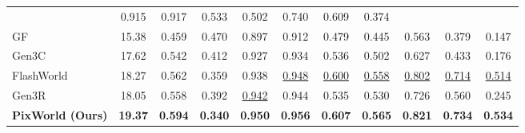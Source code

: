 \begin{table}[t]
{\begin{tabular}{l ccc cccc ccc}
& 0.915 & 0.917 & 0.533 & 0.502 
& 0.740 & 0.609 & 0.374 \\
GF~\citep{wu2025geometry}           
& 15.38 & 0.459 & 0.470 
& 0.897 & 0.912 & 0.479 & 0.445 
& 0.563 & 0.379 & 0.147 \\
Gen3C~\citep{ren2025gen3c}          
& 17.62 & 0.542 & 0.412 
& 0.927 & 0.934 & 0.536 & 0.502 
& 0.627 & 0.433 & 0.176 \\
FlashWorld~\citep{li2025flashworld} 
& 18.27 & 0.562 & 0.359 
& 0.938 & \underline{0.948} & \underline{0.600} & \underline{0.558} 
& \underline{0.802} & \underline{0.714} & \underline{0.514} \\
Gen3R~\citep{huang2026gen3r}        
& 18.05 & 0.558 & 0.392 
& \underline{0.942} & 0.944 & 0.535 & 0.530 
& 0.726 & 0.560 & 0.245 \\
\rowcolor{cyan!8}
\textbf{PixWorld (Ours)}           
& \textbf{19.37} & \textbf{0.594} & \textbf{0.340} 
& \textbf{0.950} & \textbf{0.956} & \textbf{0.607} & \textbf{0.565} 
& \textbf{0.821} & \textbf{0.734} & \textbf{0.534} \\
\bottomrule
\end{tabular}}
\vspace{-2mm}
\end{table}